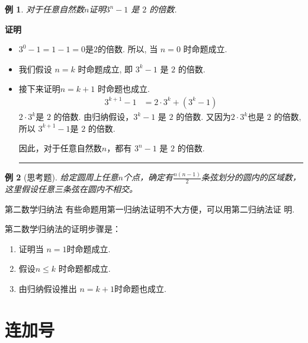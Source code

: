 \documentclass[13pt,punct]{ctexbeamer}
\newtheorem{exa}{例}
\def\qed{\nopagebreak\hfill{\rule{4pt}{7pt}}\medbreak}
\def\pf{{\bf 证明~~ }}
\begin{document}
\begin{frame}
\begin{exa}
对于任意自然数$n$证明$3^n−1$ 是 $2$ 的倍数.
\end{exa}

\pause
\pf

\begin{itemize}
	\item  $3^0−1 = 1−1 = 0$是$ 2 $的倍数.  所以, 当 $n=0$ 时命题成立.
	\item 我们假设 $n=k$ 时命题成立, 即 $3^{k}−1$ 是 $2$ 的倍数.
	\item 接下来证明$n=k+1$ 时命题也成立.
	\begin{align*}
		3^{k+1}-1 & = 2 \cdot 3^{k}+(3^{k}-1 )
	\end{align*}
	$2 \cdot 3^{k}$是 $2$ 的倍数.
	由归纳假设，$3^{k}−1$ 是 $2$ 的倍数.
	又因为$2 \cdot 3^{k}$也是 $2$ 的倍数,
	所以	$3^{k+1}-1$是 $2$ 的倍数.

	因此，对于任意自然数$n$，都有 $3^n−1$ 是 $2$ 的倍数.
	 \qed
\end{itemize}
\end{frame}

\begin{frame}
	\begin{exa}[思考题]
给定圆周上任意$n$个点，确定有$\frac{n(n-1)}{2}$条弦划分的圆内的区域数，这里假设任意三条弦在圆内不相交。
	\end{exa}




\end{frame}

\begin{frame}{第二数学归纳法}
有些命题用第一归纳法证明不大方便，可以用第二归纳法证
明.

第二数学归纳法的证明步骤是：
\begin{enumerate}
\item 证明当 $n=1$时命题成立.
\item 假设$n\le k$ 时命题都成立.
\item 由归纳假设推出 $n=k+1$时命题也成立.
\end{enumerate}

\end{frame}






\section{连加号}
\end{document}
